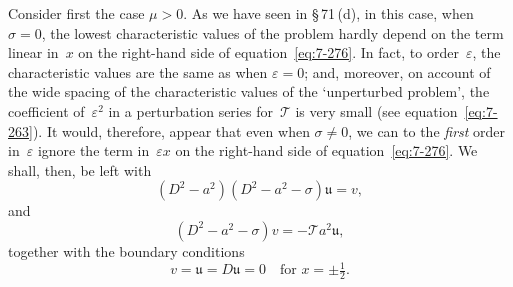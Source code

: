 Consider first the case $\mu > 0$.  As we have seen in \S\,71\,(d), in this case,
when $\sigma = 0$, the lowest characteristic values of the problem hardly
depend on the term linear in~$x$ on the right-hand side of equation~\eqref{eq:7-276}.
In fact, to order~$\varepsilon$, the characteristic values are the same as when $\varepsilon = 0$;
and, moreover, on account of the wide spacing of the characteristic
values of the `unperturbed problem', the coefficient of~$\varepsilon^2$ in a perturbation
series for~$\mathscr{T}$ is very small (see equation~\eqref{eq:7-263}).  It would, therefore,
appear that even when $\sigma \ne 0$, we can to the \emph{first} order in~$\varepsilon$ ignore the term
in~$\varepsilon x$ on the right-hand side of equation~\eqref{eq:7-276}.  We shall, then, be left with
\begin{equation}
\label{eq:7-279}
(D^2-a^2)(D^2-a^2-\sigma)\mathfrak{u} = v,
\end{equation}
and
\begin{equation}
\label{eq:7-280}
(D^2-a^2-\sigma)v = -\mathscr{T}a^2\mathfrak{u},
\end{equation}
together with the boundary conditions
\begin{equation}
\label{eq:7-281}
v = \mathfrak{u} = D\mathfrak{u} = 0 \quad \text{for } x = \pm\tfrac{1}{2}.
\end{equation}

